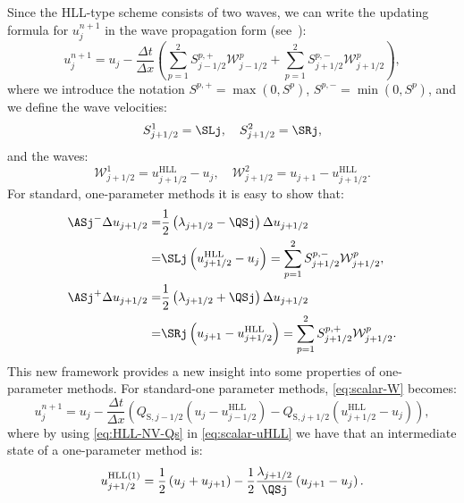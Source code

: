 Since the HLL-type scheme consists of two waves, we can write the updating formula for $ u_j^{n+1} $ in the wave propagation form (see~\cite[p.~80]{lev01}):
\begin{equation} \label{eq:scalar-W}
u_j^{n+1} = u_j - \frac{\Delta t}{\Delta x} \left( \sum_{p=1}^{2} S_{j-1/2}^{p,+} \mathcal{W}_{j-1/2}^p + \sum_{p=1}^{2} S_{j+1/2}^{p,-} \mathcal{W}_{j+1/2}^p \right), 
\end{equation}
where we introduce the notation $ S^{p,+} = \max \left( 0, S^p \right) $, $ S^{p,-} = \min \left( 0, S^p \right) $, and we define the wave velocities:
\begin{equation} \label{eq:scalar-W-S}
S_{j+1/2}^1 = \SLj, \quad S_{j+1/2}^2 = \SRj,
\end{equation}
and the waves:
\begin{equation} 
\mathcal{W}_{j+1/2}^1 = u_{j+1/2}^\text{HLL} - u_{j}, \quad \mathcal{W}_{j+1/2}^2 = u_{j+1} - u_{j+1/2}^\text{HLL}.
\end{equation}
For standard, one-parameter methods it is easy to show that:
\begin{align}
\ASj^- \Delta u_{j+1/2}
= & \frac{1}{2} \left( \lambda_{j+1/2} - \QSj \right) \Delta u_{j+1/2} \notag \\
= & \SLj \left( u_{j+1/2}^\text{HLL} - u_j \right) =
\sum_{p=1}^{2} S_{j+1/2}^{p,-} \mathcal{W}_{j+1/2}^p, \\
\ASj^+ \Delta u_{j+1/2}
= & \frac{1}{2} \left( \lambda_{j+1/2} + \QSj \right) \Delta u_{j+1/2} \notag \\
= & \SRj \left( u_{j+1} - u_{j+1/2}^\text{HLL} \right) =
\sum_{p=1}^{2} S_{j+1/2}^{p,+} \mathcal{W}_{j+1/2}^p.
\end{align}
This new framework provides a new insight into some properties of one-parameter methods. For standard-one parameter methods, \eqref{eq:scalar-W} becomes:
\begin{equation} \label{eq:scalar-W-oneQ}
u_j^{n+1} = u_j - \frac{\Delta t}{\Delta x} 
\left( 
Q_{\text{S},j-1/2} \left( u_{j} - u_{j-1/2}^\text{HLL} \right) - 
Q_{\text{S},j+1/2} \left( u_{j+1/2}^\text{HLL} - u_j \right) 
\right), 
\end{equation}
where by using \eqref{eq:HLL-NV-Qs} in \eqref{eq:scalar-uHLL} we have that an intermediate state of a one-parameter method is:
\begin{equation} \label{eq:scalar-uHLL1}
u_{j+1/2}^\text{HLL(1)} = \frac{1}{2} \left( u_{j} + u_{j+1} \right) - \frac{1}{2} \frac{\lambda_{j+1/2}}{\QSj}\left( u_{j+1} - u_j \right).
\end{equation}
